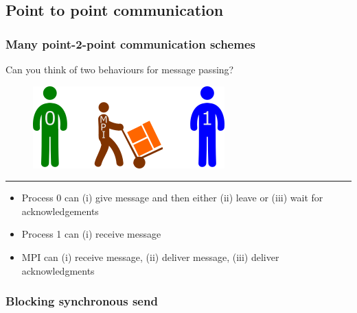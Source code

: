 \subsection{Point to point
communication}\label{point-to-point-communication}

\subsubsection{Many point-2-point communication
schemes}\label{many-point-2-point-communication-schemes}

Can you think of two behaviours for message passing?

\begin{figure}[htbp]
\centering
\includegraphics{06MPI/figures/mpi.png}
\end{figure}

\begin{center}\rule{3in}{0.4pt}\end{center}

\begin{itemize}
\itemsep1pt\parskip0pt
\item
  Process 0 can (i) give message and then either (ii) leave or (iii)
  wait for acknowledgements
\item
  Process 1 can (i) receive message
\item
  MPI can (i) receive message, (ii) deliver message, (iii) deliver
  acknowledgments
\end{itemize}

\subsubsection{Blocking synchronous
send}\label{blocking-synchronous-send}

